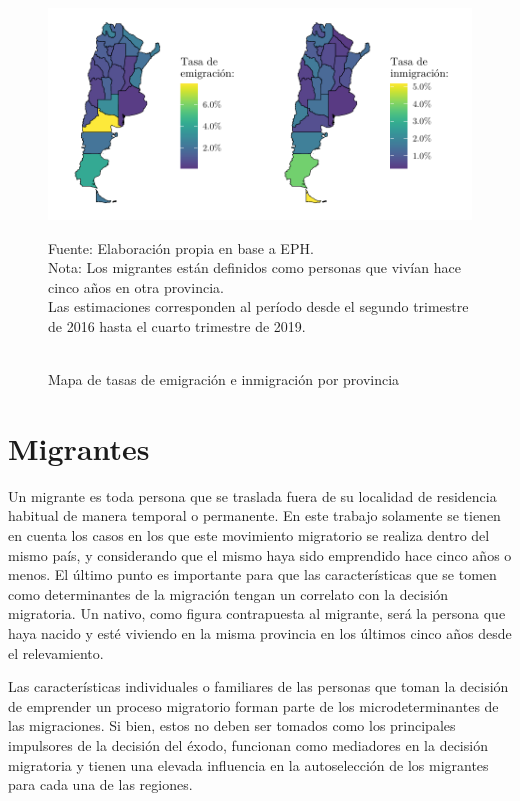 \documentclass[12pt,a4paper]{article}
\begin{document}
\begin{figure}[hbp!]
\begin{center}
\caption{\\Mapa de tasas de emigración e inmigración por provincia}
\includegraphics[scale=1.1]{./graficos/emig_inmig_por_prov.pdf}
\label{figure:emig_inmig_prov_mapa}
\end{center}
\begin{flushleft}
\begin{scriptsize}
Fuente: Elaboración propia en base a EPH.\\
Nota: Los migrantes están definidos como personas que vivían hace cinco años en otra provincia.\\
Las estimaciones corresponden al período desde el segundo trimestre de 2016 hasta el cuarto trimestre de 2019.\\
\end{scriptsize}
\end{flushleft}
\end{figure}
\newpage
\section{Migrantes}
Un migrante es toda persona que se traslada fuera de su localidad de residencia habitual de manera temporal o permanente. En este trabajo solamente se tienen en cuenta los casos en los que este movimiento migratorio se realiza dentro del mismo país, y considerando que el mismo haya sido emprendido hace cinco años o menos. El último punto es importante para que las características que se tomen como determinantes de la migración tengan un correlato con la decisión migratoria. Un nativo, como figura contrapuesta al migrante, será la persona que haya nacido y esté viviendo en la misma provincia en los últimos cinco años desde el relevamiento.

Las características individuales o familiares de las personas que toman la decisión de emprender un proceso migratorio forman parte de los microdeterminantes de las migraciones. Si bien, estos no deben ser tomados como los principales impulsores de la decisión del éxodo, funcionan como mediadores en la decisión migratoria y tienen una elevada influencia en la autoselección de los migrantes para cada una de las regiones.
\end{document}

